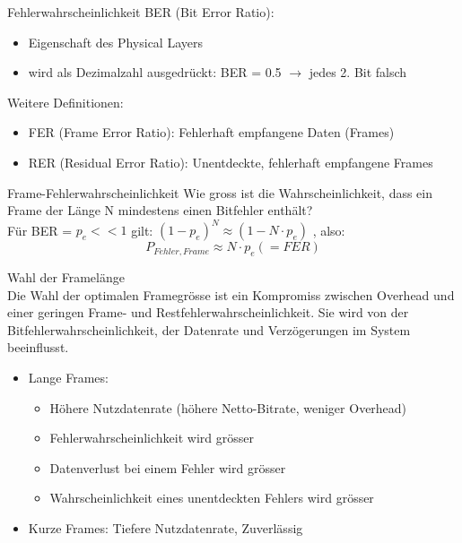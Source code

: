 \begin{definition}{Fehlerwahrscheinlichkeit}
    BER (Bit Error Ratio):
    \begin{itemize}
        \item Eigenschaft des Physical Layers
        \item wird als Dezimalzahl ausgedrückt: BER = 0.5 $\rightarrow$ jedes 2. Bit falsch
    \end{itemize}
    Weitere Definitionen:
    \begin{itemize}
        \item FER (Frame Error Ratio): Fehlerhaft empfangene Daten (Frames)
        \item RER (Residual Error Ratio): Unentdeckte, fehlerhaft empfangene Frames
    \end{itemize}
\end{definition}

\begin{KR}{Frame-Fehlerwahrscheinlichkeit}
    Wie gross ist die Wahrscheinlichkeit, dass ein Frame der Länge N mindestens einen Bitfehler enthält?\\
    Für BER = $p_e << 1$ gilt: $(1 - p_e)^N \approx (1 - N \cdot p_e)$ , also: 
    $$P_{Fehler, Frame} \approx N \cdot p_e (=FER)$$
\end{KR}

\begin{theorem}{Wahl der Framelänge}\\
    Die Wahl der optimalen Framegrösse ist ein Kompromiss zwischen Overhead und einer geringen Frame- und Restfehlerwahrscheinlichkeit. Sie wird von der Bitfehlerwahrscheinlichkeit, der Datenrate und Verzögerungen im System beeinflusst.
    \begin{itemize}
    \item Lange Frames:
    \begin{itemize}
        \item Höhere Nutzdatenrate (höhere Netto-Bitrate, weniger Overhead)
        \item Fehlerwahrscheinlichkeit wird grösser
        \item Datenverlust bei einem Fehler wird grösser
        \item Wahrscheinlichkeit eines unentdeckten Fehlers wird grösser
    \end{itemize}
    \item Kurze Frames: Tiefere Nutzdatenrate, Zuverlässig
    \end{itemize}
\end{theorem}



